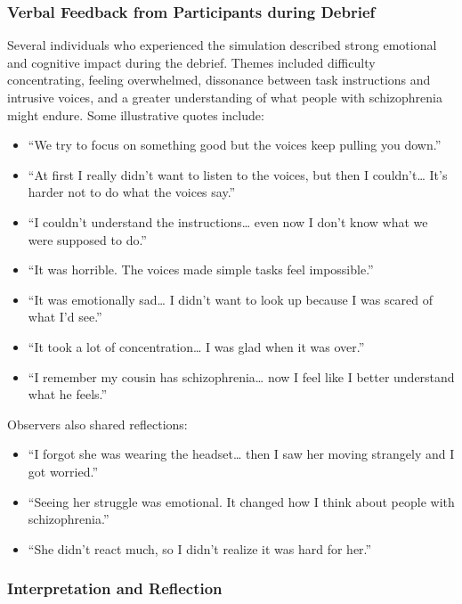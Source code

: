 \subsubsection{Verbal Feedback from Participants during Debrief}

Several individuals who experienced the simulation described strong emotional and cognitive impact during the debrief. Themes included difficulty concentrating, feeling overwhelmed, dissonance between task instructions and intrusive voices, and a greater understanding of what people with schizophrenia might endure. Some illustrative quotes include:

\begin{itemize}
  \item “We try to focus on something good but the voices keep pulling you down.”
  \item “At first I really didn't want to listen to the voices, but then I couldn't… It's harder not to do what the voices say.”
  \item “I couldn’t understand the instructions… even now I don’t know what we were supposed to do.”
  \item “It was horrible. The voices made simple tasks feel impossible.”
  \item “It was emotionally sad… I didn’t want to look up because I was scared of what I’d see.”
  \item “It took a lot of concentration… I was glad when it was over.”
  \item “I remember my cousin has schizophrenia… now I feel like I better understand what he feels.”
\end{itemize}

Observers also shared reflections:

\begin{itemize}
  \item “I forgot she was wearing the headset… then I saw her moving strangely and I got worried.”
  \item “Seeing her struggle was emotional. It changed how I think about people with schizophrenia.”
  \item “She didn’t react much, so I didn’t realize it was hard for her.”
\end{itemize}

\subsubsection{Interpretation and Reflection}

